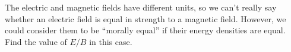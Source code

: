 The electric and magnetic fields have different units, so we can't really say whether
an electric field is equal in strength to a magnetic field. However, we could consider
them to be ``morally equal'' if their energy densities are equal. Find the value of
$E/B$ in this case.\answercheck

